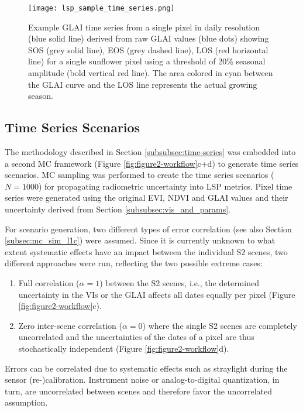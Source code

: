 \begin{figure*}
    \centering
    \texttt{[image: lsp\_sample\_time\_series.png]}
    \caption{Example \gls{GLAI} time series from a single pixel in daily resolution (blue solid line) derived from raw \gls{GLAI} values (blue dots) showing \gls{SOS} (grey solid line), \gls{EOS} (grey dashed line), \gls{LOS} (red horizontal line) for a single sunflower pixel using a threshold of 20\% seasonal amplitude (bold vertical red line). The area colored in cyan between the \gls{GLAI} curve and the \gls{LOS} line represents the actual growing season.}
    \label{fig:lsp_example}
\end{figure*}

\subsection{Time Series Scenarios}
\label{subsec:time-series-scenarios}
The methodology described in Section \ref{subsubsec:time-series} was embedded into a second \gls{MC} framework (Figure \ref{fig:figure2-workflow}c+d) to generate time series scenarios. \gls{MC} sampling was performed to create the time series scenarios ($N=1000$) for propagating radiometric uncertainty into \gls{LSP} metrics. Pixel time series were generated using the original \gls{EVI}, \gls{NDVI} and \gls{GLAI} values and their uncertainty derived from Section \ref{subsubsec:vis_and_params}.

For scenario generation, two different types of error correlation (see also Section \ref{subsec:mc_sim_l1c}) were assumed. Since it is currently unknown to what extent systematic effects have an impact between the individual \gls{S2} scenes, two different approaches were run, reflecting the two possible extreme cases:

\begin{enumerate}
    \item Full correlation ($\alpha=1$) between the \gls{S2} scenes, i.e., the determined uncertainty in the VIs or the \gls{GLAI} affects all dates equally per pixel (Figure \ref{fig:figure2-workflow}c).
    \item  Zero inter-scene correlation ($\alpha=0$) where the single \gls{S2} scenes are completely uncorrelated and the uncertainties of the dates of a pixel are thus stochastically independent (Figure \ref{fig:figure2-workflow}d).
\end{enumerate}

Errors can be correlated due to systematic effects such as straylight during the sensor (re-)calibration. Instrument noise or analog-to-digital quantization, in turn, are uncorrelated between scenes and therefore favor the uncorrelated assumption.

